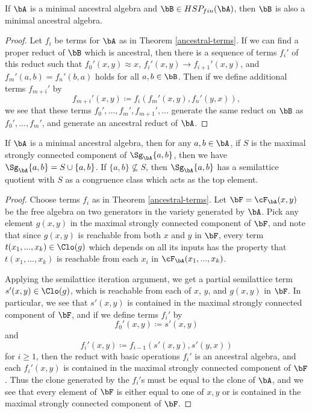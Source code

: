 \begin{prop} If $\bA$ is a minimal ancestral algebra and $\bB \in HSP_{fin}(\bA)$, then $\bB$ is also a minimal ancestral algebra.
\end{prop}
\begin{proof} Let $f_i$ be terms for $\bA$ as in Theorem \ref{ancestral-terms}. If we can find a proper reduct of $\bB$ which is ancestral, then there is a sequence of terms $f_i'$ of this reduct such that $f_0'(x,y) \approx x$, $f_i'(x,y) \rightarrow f_{i+1}'(x,y)$, and $f_m'(a,b) = f_n'(b,a)$ holds for all $a,b \in \bB$. Then if we define additional terms $f_{m+i}'$ by
\[
f_{m+i}'(x,y) \coloneqq f_i(f_m'(x,y), f_n'(y,x)),
\]
we see that these terms $f_0', ..., f_m', f_{m+1}', ...$ generate the same reduct on $\bB$ as $f_0', ..., f_m'$, and generate an ancestral reduct of $\bA$.
\end{proof}

\begin{thm}\label{ancestral-absorption} If $\bA$ is a minimal ancestral algebra, then for any $a,b \in \bA$, if $S$ is the maximal strongly connected component of $\Sg_\bA\{a,b\}$, then we have $\Sg_\bA\{a,b\} = S \cup \{a,b\}$. If $\{a,b\} \not\subseteq S$, then $\Sg_\bA\{a,b\}$ has a semilattice quotient with $S$ as a congruence class which acts as the top element.
\end{thm}
\begin{proof} Choose terms $f_i$ as in Theorem \ref{ancestral-terms}. Let $\bF = \cF_\bA(x,y)$ be the free algebra on two generators in the variety generated by $\bA$. Pick any element $g(x,y)$ in the maximal strongly connected component of $\bF$, and note that since $g(x,y)$ is reachable from both $x$ and $y$ in $\bF$, every term $t(x_1, ..., x_k) \in \Clo(g)$ which depends on all its inputs has the property that $t(x_1, ..., x_k)$ is reachable from each $x_i$ in $\cF_\bA(x_1, ..., x_k)$.

Applying the semilattice iteration argument, we get a partial semilattice term $s'(x,y) \in \Clo(g)$, which is reachable from each of $x$, $y$, and $g(x,y)$ in $\bF$. In particular, we see that $s'(x,y)$ is contained in the maximal strongly connected component of $\bF$, and if we define terms $f_i'$ by
\[
f_0'(x,y) \coloneqq s'(x,y)
\]
and
\[
f_i'(x,y) \coloneqq f_{i-1}(s'(x,y),s'(y,x))
\]
for $i \ge 1$, then the reduct with basic operations $f_i'$ is an ancestral algebra, and each $f_i'(x,y)$ is contained in the maximal strongly connected component of $\bF$. Thus the clone generated by the $f_i'$s must be equal to the clone of $\bA$, and we see that every element of $\bF$ is either equal to one of $x,y$ or is contained in the maximal strongly connected component of $\bF$.
\end{proof}

